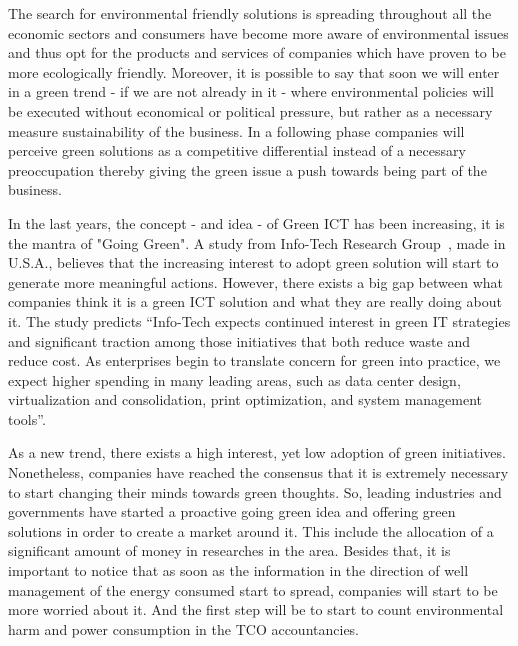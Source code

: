     The search for environmental friendly solutions is spreading throughout all the economic sectors and consumers have become more aware of environmental issues and thus opt for the products and services of companies which have proven to be more ecologically friendly. Moreover, it is possible to say that soon we will enter in a green trend - if we are not already in it - where environmental policies will be executed without economical or political pressure, but rather as a necessary measure sustainability of the business. In a following phase companies will perceive green solutions as a competitive differential instead of a necessary preoccupation thereby giving the green issue a push towards being part of the business.
        
    In the last years, the concept - and idea - of Green ICT has been increasing, it is the mantra of "Going Green". A study from Info-Tech Research Group~\cite{info-tech07}, made in U.S.A., believes that the increasing interest to adopt green solution will start to generate more meaningful actions. However, there exists a big gap between what companies think it is a green ICT solution and what they are really doing about it. The study predicts ``Info-Tech expects continued interest in green IT strategies and significant traction among those initiatives that both reduce waste and reduce cost. As enterprises begin to translate concern for green into practice, we expect higher spending in many leading areas, such as data center design, virtualization and consolidation, print optimization, and system management tools''.
    
    As a new trend, there exists a high interest, yet low adoption of green initiatives. Nonetheless, companies have reached the consensus that it is extremely necessary to start changing their minds towards green thoughts. So, leading industries and governments have started a proactive going green idea and offering green solutions in order to create a market around it. This include the allocation of a significant amount of money in researches in the area. Besides that, it is important to notice that as soon as the information in the direction of well management of the energy consumed start to spread, companies will start to be more worried about it. And the first step will be to start to count environmental harm and power consumption in the TCO accountancies.
    
